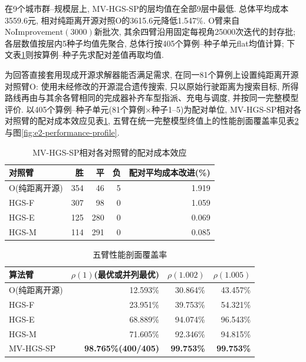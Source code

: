 \documentclass{setp-new}
\newcommand{\setptabsetup}{\fontsize{9pt}{10.5pt}\selectfont\renewcommand{\arraystretch}{0.95}\setlength{\tabcolsep}{2.2pt}\setlength{\aboverulesep}{0.4pt}\setlength{\belowrulesep}{0.4pt}\hbadness=10000}
\begin{document}
在9个城市群--规模层上, MV-HGS-SP的层均值在全部9层中最低.
总体平均成本3559.6元, 相对纯距离开源对照O的3615.6元降低1.547\%.
O臂来自$\mathrm{NoImprovement}(3000)$新批次, 其余四臂沿用固定每视角25000次迭代的封存批;
各层数值按层内5种子均值先聚合, 总体行按405个算例--种子单元flat均值计算;
下文表\ref{tab:mv-vs-o}则按算例--种子先求配对差值再取均值.

为回答直接套用现成开源求解器能否满足需求, 在同一81个算例上设置纯距离开源对照臂O:
使用未经修改的开源混合遗传搜索\cite{ref:64}, 只以原始行驶距离为搜索目标,
所得路线再由与其余各臂相同的完成器补齐车型指派、充电与调度, 并按同一完整模型评价.
以405个算例--种子单元(81个算例$\times$种子1--5)为配对单位,
MV-HGS-SP相对各对照臂的配对成本效应见表\ref{tab:mv-vs-o},
五臂在统一完整模型终值上的性能剖面覆盖率见表\ref{tab:e2-profile}与图\ref{fig:e2-performance-profile}.

\begin{table}[H]
\centering
\caption{MV-HGS-SP相对各对照臂的配对成本效应}
\label{tab:mv-vs-o}
\setptabsetup
\begin{tabular*}{\linewidth}{@{\extracolsep{\fill}}lrrrr@{}}
\toprule
对照臂 & 胜 & 平 & 负 & 配对平均成本改进(\%)\\
\midrule
O(纯距离开源) & 354 & 46 & 5 & 1.919 \\
HGS-F & 307 & 98 & 0 & 1.059 \\
HGS-E & 125 & 280 & 0 & 0.069 \\
HGS-M & 114 & 291 & 0 & 0.085 \\
\bottomrule
\end{tabular*}
\end{table}

\begin{table}[H]
\centering
\caption{五臂性能剖面覆盖率}
\label{tab:e2-profile}
\setptabsetup
\begin{tabular*}{\linewidth}{@{\extracolsep{\fill}}lrrr@{}}
\toprule
算法臂 & $\rho(1)$(最优或并列最优) & $\rho(1.002)$ & $\rho(1.005)$\\
\midrule
O(纯距离开源) & 12.593\% & 30.864\% & 43.457\% \\
HGS-F & 23.951\% & 39.753\% & 54.321\% \\
HGS-E & 68.889\% & 94.074\% & 96.543\% \\
HGS-M & 71.605\% & 92.346\% & 94.815\% \\
MV-HGS-SP & \textbf{98.765\%(400/405)} & \textbf{99.753\%} & \textbf{99.753\%} \\
\bottomrule
\end{tabular*}
\end{table}
\end{document}

